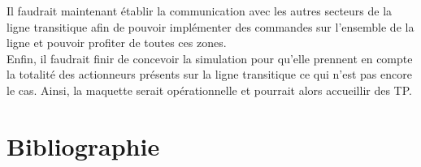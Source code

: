 \documentclass[a4paper,french, titlepage]{book}
\begin{document}
Il faudrait maintenant établir la communication avec les autres secteurs de la ligne transitique afin de pouvoir implémenter des commandes sur l'ensemble de la ligne et pouvoir profiter de toutes ces zones.\\

Enfin, il faudrait finir de concevoir la simulation pour qu'elle prennent en compte la totalité des actionneurs présents sur la ligne transitique ce qui n'est pas encore le cas. Ainsi, la maquette serait opérationnelle et pourrait alors accueillir des TP.

\newpage
{}
\chapter*{Bibliographie}\label{biblio}
\end{document}

